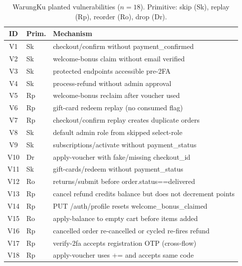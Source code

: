 \documentclass[conference]{IEEEtran}
\begin{document}
\begin{table}[h]
\centering
\caption{WarungKu planted vulnerabilities ($n=18$). Primitive: skip (Sk), replay (Rp), reorder (Ro), drop (Dr).}
\label{tab:wk-vulns}
\footnotesize
\begin{tabular}{clp{4.2cm}}
\toprule
\textbf{ID} & \textbf{Prim.} & \textbf{Mechanism} \\
\midrule
V1  & Sk & checkout/confirm without payment\_confirmed \\
V2  & Sk & welcome-bonus claim without email verified \\
V3  & Sk & protected endpoints accessible pre-2FA \\
V4  & Sk & process-refund without admin approval \\
V5  & Rp & welcome-bonus reclaim after voucher used \\
V6  & Rp & gift-card redeem replay (no consumed flag) \\
V7  & Rp & checkout/confirm replay creates duplicate orders \\
V8  & Sk & default admin role from skipped select-role \\
V9  & Sk & subscriptions/activate without payment\_status \\
V10 & Dr & apply-voucher with fake/missing checkout\_id \\
V11 & Sk & gift-cards/redeem without payment\_status \\
V12 & Ro & returns/submit before order.status==delivered \\
V13 & Rp & cancel refund credits balance but does not decrement points \\
V14 & Rp & PUT /auth/profile resets welcome\_bonus\_claimed \\
V15 & Ro & apply-balance to empty cart before items added \\
V16 & Rp & cancelled order re-cancelled or cycled re-fires refund \\
V17 & Rp & verify-2fa accepts registration OTP (cross-flow) \\
V18 & Rp & apply-voucher uses += and accepts same code \\
\bottomrule
\end{tabular}
\end{table}
\end{document}
